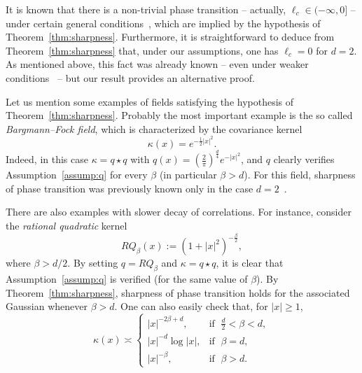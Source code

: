 \documentclass[AHL,Unicode,longabstracts,published]{cedram}
\begin{document}
\begin{rema}
It is known that there is a non-trivial phase transition -- actually, $\ell_c\in(-\infty,0]$ -- under certain general conditions~\cite{MoSt83a,MoSt83b}, which are implied by the hypothesis of Theorem~\ref{thm:sharpness}. Furthermore, it is straightforward to deduce from Theorem~\ref{thm:sharpness} that, under our assumptions, one has $\ell_c=0$ for $d=2$. As mentioned above, this fact was already known -- even under weaker conditions~\cite{MRV20} -- but our result provides an alternative proof.
\end{rema}


Let us mention some examples of fields satisfying the hypothesis of Theorem~\ref{thm:sharpness}. Probably the most important example is the so called \emph{Bargmann--Fock field}, which is characterized by the covariance kernel
\[
\kappa(x)=e^{-\frac12 |x|^2}.
\]
Indeed, in this case $\kappa= q\star q$ with $q(x)=(\frac{2}{\pi})^{\frac{d}{4}}e^{-|x|^2}$, and $q$ clearly verifies Assumption~\ref{assump:q} for every $\beta$ (in particular $\beta>d$). For this field, sharpness of phase transition was previously known only in the case $d=2$~\cite{RVb}.

There are also examples with slower decay of correlations. For instance, consider the \emph{rational quadratic} kernel
\[
RQ_{\beta}(x):= \left(1+|x|^2\right)^{-\frac{\beta}{2}},
\]
where $\beta>d/2$. By setting $q=RQ_{\beta}$ and $\kappa=q\star q$, it is clear that Assumption~\ref{assump:q} is verified (for the same value of $\beta$). By Theorem~\ref{thm:sharpness}, sharpness of phase transition holds for the associated Gaussian whenever $\beta>d$. One can also easily check that, for $|x|\geq1$,
\begin{equation}\label{eq:decay_kappa}
\kappa(x)\asymp
\begin{cases}
|x|^{-2\beta+d}, & \text{if }\;\frac{d}{2}<\beta< d,\\
|x|^{-d}\log|x|, & \text{if }\;\beta=d,\\
|x|^{-\beta}, & \text{if }\;\beta>d.
\end{cases}
\end{equation}
\end{document}
